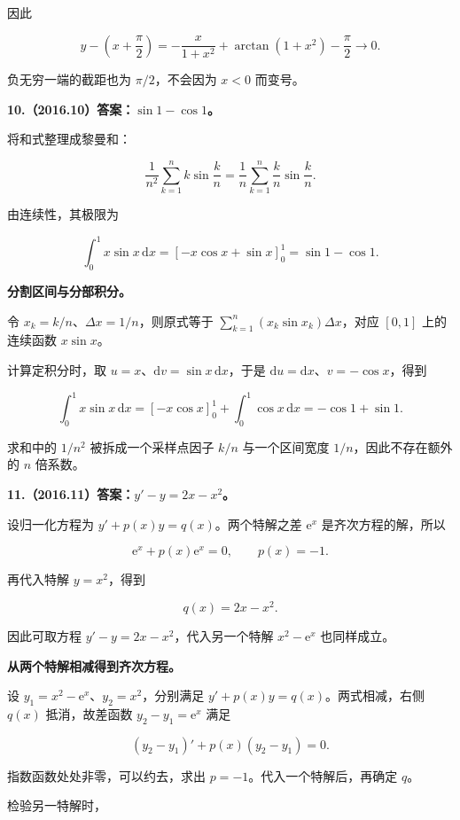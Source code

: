 \documentclass[UTF8,11pt,fontset=windows]{ctexart}
\begin{document}
因此

$$
y-\left(x+\frac\pi2\right)
=-\frac{x}{1+x^2}+\arctan(1+x^2)-\frac\pi2\longrightarrow0.
$$

负无穷一端的截距也为 $\pi/2$，不会因为 $x<0$ 而变号。

\clearpage

\textbf{10.（2016.10）答案：$\sin1-\cos1$。}

将和式整理成黎曼和：

$$
\frac1{n^2}\sum_{k=1}^n k\sin\frac kn
=\frac1n\sum_{k=1}^n\frac kn\sin\frac kn.
$$

由连续性，其极限为

$$
\int_0^1x\sin x\,\mathrm dx
=\left[-x\cos x+\sin x\right]_0^1
=\sin1-\cos1.
$$

\textbf{分割区间与分部积分。}

令 $x_k=k/n$、$\Delta x=1/n$，则原式等于 $\sum_{k=1}^n(x_k\sin x_k)\Delta x$，对应 $[0,1]$ 上的连续函数 $x\sin x$。

计算定积分时，取 $u=x$、$\mathrm dv=\sin x\,\mathrm dx$，于是 $\mathrm du=\mathrm dx$、$v=-\cos x$，得到

$$
\int_0^1x\sin x\,\mathrm dx
=[-x\cos x]_0^1+\int_0^1\cos x\,\mathrm dx
=-\cos1+\sin1.
$$

求和中的 $1/n^2$ 被拆成一个采样点因子 $k/n$ 与一个区间宽度 $1/n$，因此不存在额外的 $n$ 倍系数。

\clearpage

\textbf{11.（2016.11）答案：$y'-y=2x-x^2$。}

设归一化方程为 $y'+p(x)y=q(x)$。两个特解之差 $\mathrm e^x$ 是齐次方程的解，所以

$$
\mathrm e^x+p(x)\mathrm e^x=0,
\qquad p(x)=-1.
$$

再代入特解 $y=x^2$，得到

$$
q(x)=2x-x^2.
$$

因此可取方程 $y'-y=2x-x^2$，代入另一个特解 $x^2-\mathrm e^x$ 也同样成立。

\textbf{从两个特解相减得到齐次方程。}

设 $y_1=x^2-\mathrm e^x$、$y_2=x^2$，分别满足 $y'+p(x)y=q(x)$。两式相减，右侧 $q(x)$ 抵消，故差函数 $y_2-y_1=\mathrm e^x$ 满足

$$
(y_2-y_1)'+p(x)(y_2-y_1)=0.
$$

指数函数处处非零，可以约去，求出 $p=-1$。代入一个特解后，再确定 $q$。

检验另一特解时，
\end{document}
